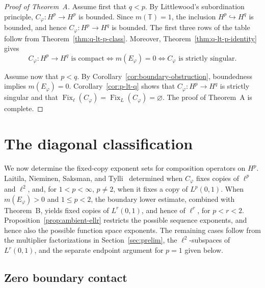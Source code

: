 \documentclass[10pt,a4paper]{amsart}
\newcommand{\T}{\mathbb{T}}
\begin{document}
\begin{proof}[Proof of Theorem~A]
Assume first that \(q<p\). By Littlewood's subordination principle,
\(C_\varphi:H^p\to H^p\) is bounded. Since \(m(\T)=1\), the inclusion
\(H^p\hookrightarrow H^q\) is bounded, and hence
\(C_\varphi:H^p\to H^q\) is bounded. The first three rows of the table
follow from
Theorem~\ref{thm:q-lt-p-class}.
Moreover, Theorem~\ref{thm:q-lt-p-identity} gives
\[
C_\varphi:H^p\to H^q\text{ is compact}
\Longleftrightarrow
m(E_\varphi)=0
\Longleftrightarrow
C_\varphi\text{ is strictly singular}.
\]

Assume now that \(p<q\). By
Corollary~\ref{cor:boundary-obstruction}, boundedness implies
\(m(E_\varphi)=0\). Corollary~\ref{cor:p-lt-q}
shows that \(C_\varphi:H^p\to H^q\) is strictly singular and that
\(\operatorname{Fix}_{\ell}(C_\varphi)
=\operatorname{Fix}_{L}(C_\varphi)=\varnothing\).
The proof of Theorem~A is complete. 
\end{proof}
\smallskip   







\section{The diagonal classification}
\label{sec:diag}

We now determine the fixed-copy exponent sets for composition operators
on \(H^p\). Laitila, Nieminen, Saksman, and Tylli~\cite{LNST2017}
determined when \(C_\varphi\) fixes copies of \(\ell^p\) and
\(\ell^2\), and, for \(1<p<\infty\), \(p\ne2\), when it fixes a copy
of \(L^p(0,1)\). When \(m(E_\varphi)>0\) and \(1\le p<2\), the
boundary lower estimate, combined with Theorem~B, yields fixed copies
of \(L^r(0,1)\), and hence of \(\ell^r\), for \(p<r<2\).
Proposition~\ref{prop:ambient-ellr} restricts the possible sequence
exponents, and hence also the possible function space exponents. The
remaining cases follow from the multiplier factorizations in
Section~\ref{sec:prelim}, the \(\ell^2\)-subspaces of
\(L^r(0,1)\), and the separate endpoint argument for \(p=1\) given
below.



\subsection{Zero boundary contact}
\end{document}
